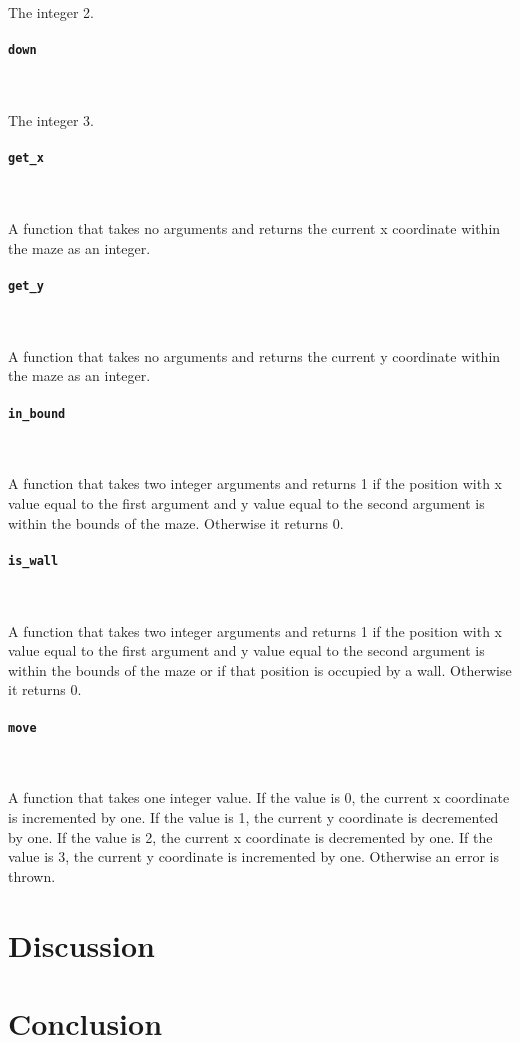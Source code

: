 \documentclass[12pt, a4paper]{article}
\begin{document}
The integer 2.

\paragraph{\texttt{down}} \

The integer 3.

\paragraph{\texttt{get\_x}} \

A function that takes no arguments and returns the current x coordinate within the maze as an integer.

\paragraph{\texttt{get\_y}} \

A function that takes no arguments and returns the current y coordinate within the maze as an integer.

\paragraph{\texttt{in\_bound}} \

A function that takes two integer arguments and returns 1 if the position with x value equal to the first argument and y value equal to the second argument is within the bounds of the maze. Otherwise it returns 0.

\paragraph{\texttt{is\_wall}} \

A function that takes two integer arguments and returns 1 if the position with x value equal to the first argument and y value equal to the second argument is within the bounds of the maze or if that position is occupied by a wall. Otherwise it returns 0.

\paragraph{\texttt{move}} \

A function that takes one integer value. If the value is 0, the current x coordinate is incremented by one. If the value is 1, the current y coordinate is decremented by one. If the value is 2, the current x coordinate is decremented by one. If the value is 3, the current y coordinate is incremented by one. Otherwise an error is thrown.

\newpage

\section{Discussion}

\section{Conclusion}
\end{document}
